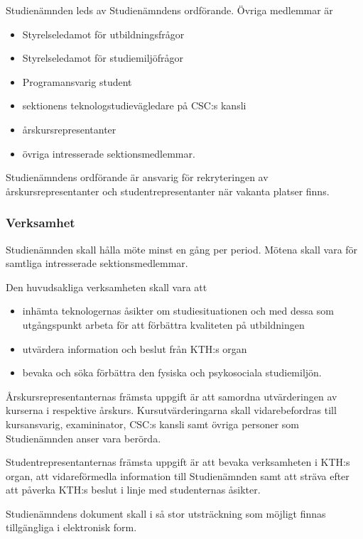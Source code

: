 \documentclass{dgovdoc}
\begin{document}
Studienämnden leds av Studienämndens ordförande. Övriga medlemmar är

\begin{itemize}
  \item Styrelseledamot för utbildningsfrågor
  \item Styrelseledamot för studiemiljöfrågor
  \item Programansvarig student
  \item sektionens teknologstudievägledare på CSC:s kansli
  \item årskursrepresentanter
  \item övriga intresserade sektionsmedlemmar.
\end{itemize}

Studienämndens ordförande är ansvarig för rekryteringen av
årskursrepresentanter och studentrepresentanter när vakanta platser finns.

\subsubsection{Verksamhet}

Studienämnden skall hålla möte minst en gång per period. Mötena skall vara för
samtliga intresserade sektionsmedlemmar.

Den huvudsakliga verksamheten skall vara att

\begin{itemize}
  \item inhämta teknologernas åsikter om studiesituationen och med dessa som
    utgångspunkt arbeta för att förbättra kvaliteten på utbildningen
  \item utvärdera information och beslut från KTH:s organ
  \item bevaka och söka förbättra den fysiska och psykosociala studiemiljön.
\end{itemize}

Årskursrepresentanternas främsta uppgift är att samordna utvärderingen av
kurserna i respektive årskurs. Kursutvärderingarna skall vidarebefordras till
kursansvarig, examininator, CSC:s kansli samt övriga personer som Studienämnden
anser vara berörda.

Studentrepresentanternas främsta uppgift är att bevaka verksamheten i KTH:s
organ, att vidareförmedla information till Studienämnden samt att sträva efter
att påverka KTH:s beslut i linje med studenternas åsikter.

Studienämndens dokument skall i så stor utsträckning som möjligt finnas
tillgängliga i elektronisk form.
\end{document}
